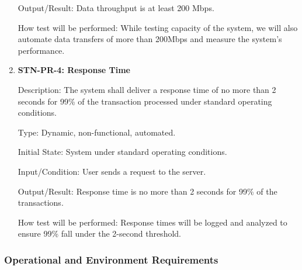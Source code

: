 \documentclass[12pt, titlepage]{article}
\begin{document}
\begin{enumerate}
        Output/Result: Data throughput is at least 200 Mbps.

        How test will be performed: While testing capacity of the system, we will also automate data transfers of more than 200Mbps and measure the system’s performance.


        \item{\textbf{STN-PR-4: Response Time}}

        Description: The system shall deliver a response time of no more than 2 seconds for 99\% of the transaction processed under standard operating conditions.

        Type: Dynamic, non-functional, automated.

        Initial State: System under standard operating conditions.

        Input/Condition: User sends a request to the server.

        Output/Result: Response time is no more than 2 seconds for 99\% of the transactions.

        How test will be performed: Response times will be logged and analyzed to ensure 99\% fall under the 2-second threshold.

    \end{enumerate}

    \subsubsection{Operational and Environment Requirements}
\end{document}
